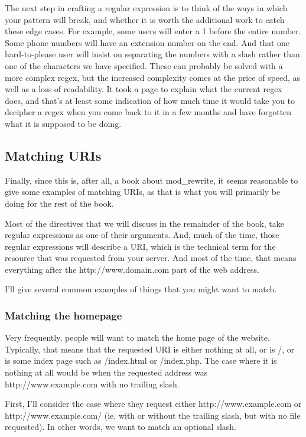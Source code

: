 The next step in crafting a regular expression is to think of the ways in which your 
pattern will break, and whether it is worth the additional work to catch these edge cases. For 
example, some users will enter a 1 before the entire number. Some phone numbers will have 
an extension number on the end. And that one hard-to-please user will insist on separating the 
numbers with a slash rather than one of the characters we have specified. These can probably 
be solved with a more complex regex, but the increased complexity comes at the price of 
speed, as well as a loss of readability. It took a page to explain what the current regex does, 
and that's at least some indication of how much time it would take you to decipher a regex 
when you come back to it in a few months and have forgotten what it is supposed to be 
doing.

\subsection{Matching URIs}

Finally, since this is, after all, a book about mod\_rewrite, it seems reasonable to give 
some examples of matching URIs, as that is what you will primarily be doing for the rest of 
the book.

Most of the directives that we will discuss in the remainder of the book, take regular 
expressions as one of their arguments. And, much of the time, those regular expressions will 
describe a URI, which is the technical term for the resource that was requested from your 
server. And most of the time, that means everything after the http://www.domain.com part of the 
web address.

I'll give several common examples of things that you might want to match.

\subsubsection{Matching the homepage}

Very frequently, people will want to match the home page of the website. Typically, that 
means that the requested URI is either nothing at all, or is /, or is some index page such as 
/index.html or /index.php. The case where it is nothing at all would be when the requested 
address was http://www.example.com with no trailing slash.

First, I'll consider the case where they request either http://www.example.com or 
http://www.example.com/ (ie, with or without the trailing slash, but with no file requested). In 
other words, we want to match an optional slash. 

